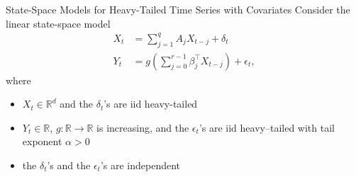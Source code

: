 \documentclass{beamer}
\newtheorem{remark}{Remark}[section]
\def\R{\mathbb R}
\begin{document}


\begin{frame}{State-Space Models for Heavy-Tailed Time Series with Covariates}
    Consider the linear state-space model
    \begin{equation}\label{eq:orig_ssm}
        \begin{split}
            X_t &= \sum_{j = 1}^q A_j X_{t - j} + \delta_t \\
            Y_t &= g \left( \sum_{j = 0}^{r - 1} \beta_j^{\top} X_{t - j} \right) + \epsilon_t,
        \end{split}
    \end{equation}
    where
    \begin{itemize}
        \item $X_t \in \R^d$ and the $\delta_t$'s are iid heavy-tailed
        \item $Y_t \in \R$, $g :\R \to \R$ is increasing, and the $\epsilon_t$'s are iid heavy--tailed with tail exponent $\alpha > 0$
        \item the $\delta_t$'s and the $\epsilon_t$'s are independent
    \end{itemize}
\end{frame}
\end{document}
